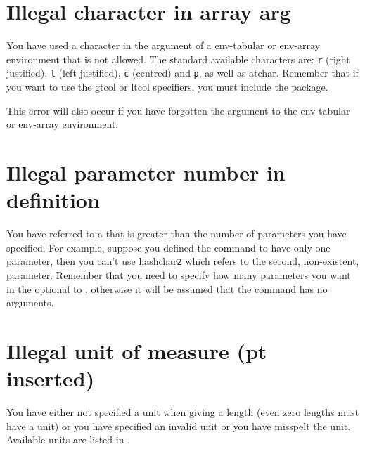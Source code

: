 
\section{Illegal character in array arg}

You have used a character in the \gls{argument} of a
\gls{env-tabular} or \gls{env-array} environment that is not
allowed. The standard available characters are: \texttt{r} (right
justified), \texttt{l} (left justified), \texttt{c} (centred) and
\texttt{p}, as well as \gls{atchar}.
Remember that if you want to use the \gls{gtcol} or 
\gls{ltcol} specifiers, you must include the
 package.

This error will also occur if you have forgotten the argument to the
\gls*{env-tabular} or \gls*{env-array} environment.


\section{Illegal parameter number in definition}

You have referred to a  that is greater than the number of parameters
you have specified. For example, suppose you defined the command to
have only one parameter, then you can't use \gls{hashchar}\texttt{2}
which refers to the second, non-existent, parameter. Remember that
you need to specify how many parameters you want in the
\gls{optional} to , otherwise it will be assumed
that the command has no arguments.


\section{Illegal unit of measure (pt inserted)}

You have either not specified a unit when giving a \gls{length} (even zero
lengths must have a unit) or you have specified an invalid unit or
you have misspelt the unit.  Available units are listed in
.

